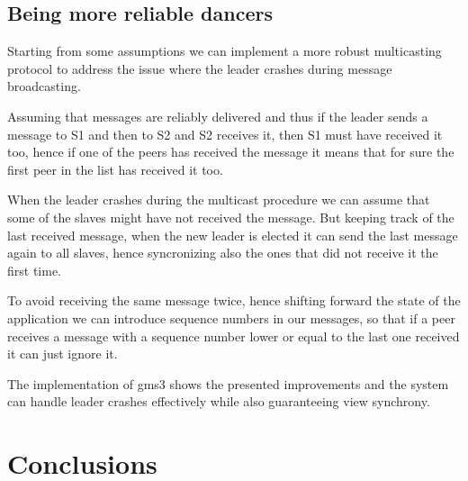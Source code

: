 \documentclass[a4paper, 11pt]{article}
\begin{document}
\subsection{Being more reliable dancers}
Starting from some assumptions we can implement a more robust multicasting protocol to address the issue where the leader crashes during message broadcasting.

Assuming that messages are reliably delivered and thus if the leader sends a message to S1 and then to S2 and S2 receives it, then S1 must have received it too, hence if one of the peers has received the message it means that for sure the first peer in the list has received it too.

When the leader crashes during the multicast procedure we can assume that some of the slaves might have not received the message. But keeping track of the last received message, when the new leader is elected it can send the last message again to all slaves, hence syncronizing also the ones that did not receive it the first time.

To avoid receiving the same message twice, hence shifting forward the state of the application we can introduce sequence numbers in our messages, so that if a peer receives a message with a sequence number lower or equal to the last one received it can just ignore it.

The implementation of gms3 shows the presented improvements and the system can handle leader crashes effectively while also guaranteeing view synchrony.

\section{Conclusions}
\end{document}

